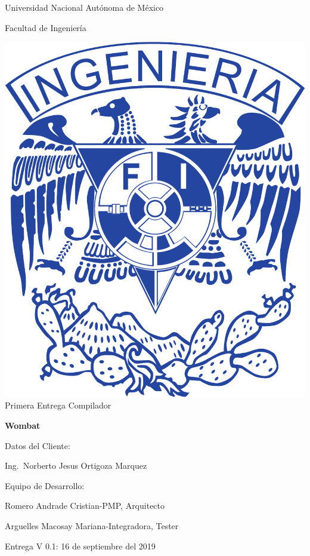 \documentclass{article}
\begin{document}
\begin{titlepage}
  \begin{center}
    \Huge{Universidad Nacional Autónoma de México}

    \Huge{Facultad de Ingeniería}
    \vfill

    \includegraphics[scale=.3]{../img/UNAM_INGENIERIA}
    \vfill
    \Large{Primera Entrega Compilador}

    
    \vfill
    \LARGE{\textbf{Wombat}}
    \vfill
  \end{center}  

  \Large{Datos del Cliente:
    
    \hspace{2cm}} Ing.\ Norberto Jesus Ortigoza Marquez
  \vfill
  
  \Large{Equipo de Desarrollo:
    
    \hspace{2cm}Romero Andrade Cristian\hfill -\hfill PMP, Arquitecto
    
    \hspace{2cm}Arguelles Macosay Mariana\hfill -\hfill Integradora, Tester}
  \vfill
  \Large{Entrega V 0.1: 16 de septiembre del 2019}
  

  
  
\end{titlepage}
\end{document}
